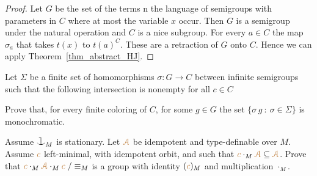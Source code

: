 \begin{proof}
  Let $G$ be the set of the terms n the language of semigroups with parameters in $C$ where at most the variable $x$ occur.
  Then $G$ is a semigroup under the natural operation and $C$ is a nice subgroup.
  For every $a\in C$ the map $\sigma_a$ that takes $t(x)$ to $t(a)^C$.
  These are a retraction of $G$ onto $C$.
  Hence we can apply Theorem~\ref{thm_abstract_HJ}.
\end{proof}

\begin{exercise}\label{thm_hom_HJ}
Let $\Sigma$ be a finite set of homomorphisms $\sigma:G\to C$ 
between infinite semigroups such that the following intersection is nonempty for all $c\in C$


Prove that, for every finite coloring of $C$, for some $g\in G$ the set 
$\{\sigma\,g\ :\ \sigma\in\Sigma\}$ is monochromatic.
\end{exercise}




\begin{exercise}
  Assume $\cnonfork_M$ is stationary.
  Let ${\color{brown}\EuScript A}$ be idempotent and type-definable over $M$.
  Assume ${\color{brown} c}$ left-minimal, with idempotent orbit, and such that ${\color{brown} c}\cdot_M{\color{brown}\EuScript A}\subseteq{\color{brown}\EuScript A}$.
  Prove that ${\color{brown} c}\cdot_M{\color{brown}\EuScript A}\cdot_M{\color{brown} c}\;/\equiv_M$ is a group with identity $({\color{brown} c})_M$ and multiplication $\cdot_M$.
\end{exercise}

